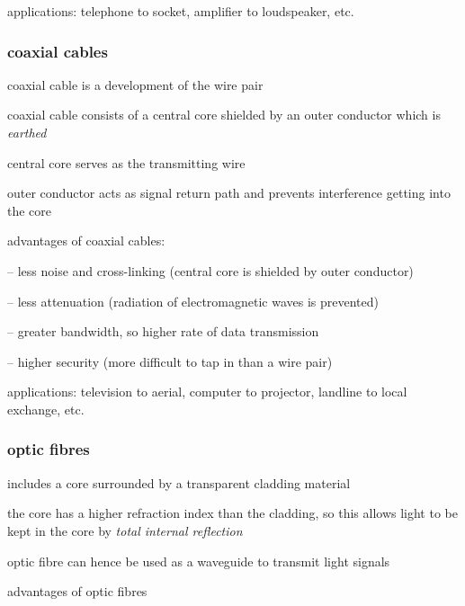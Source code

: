 \cmt applications: telephone to socket, amplifier to loudspeaker, etc.

\subsubsection{coaxial cables}

coaxial cable is a development of the wire pair

coaxial cable consists of a central core shielded by an outer conductor which is \emph{earthed}

central core serves as the transmitting wire

outer conductor acts as signal return path and prevents interference getting into the core

\cmt advantages of coaxial cables:

\begin{compactitem}
	\item[--] less noise and cross-linking (central core is shielded by outer conductor)
	
	\item[--] less attenuation (radiation of electromagnetic waves is prevented)
	
	\item[--] greater bandwidth, so higher rate of data transmission
	
	\item[--] higher security (more difficult to tap in than a wire pair)
\end{compactitem}


\cmt applications: television to aerial, computer to projector, landline to local exchange, etc.




\subsubsection{optic fibres}

 includes a core surrounded by a transparent cladding material

the core has a higher refraction index than the cladding, so this allows light to be kept in the core by \emph{total internal reflection}

optic fibre can hence be used as a waveguide to transmit light signals

\cmt advantages of optic fibres

